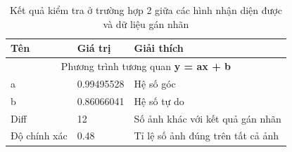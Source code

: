 \begin{table}[H]
    \begin{tabular}{p{4cm}  p{2.5cm}  p{5.5cm} }   
    \hline		
	Tên & Giá trị & Giải thích \\
	\hline
	\multicolumn{3}{c}{Phương trình tương quan \textbf{y = ax + b}} \\
	a & 0.99495528 & Hệ số góc \\
	b & 0.86066041 & Hệ số tự do \\
	\hline
	Diff & 12 & Số ảnh khác với kết quả gán nhãn \\
	Độ chính xác & 0.48 &  Tỉ lệ số ảnh đúng trên tất cả ảnh\\
	\hline
	\end{tabular}
	\caption{Kết quả kiểm tra ở trường hợp 2 giữa các hình nhận diện được và dữ liệu gán nhãn}
    \label{chap3:case2:table02}    
\end{table}

